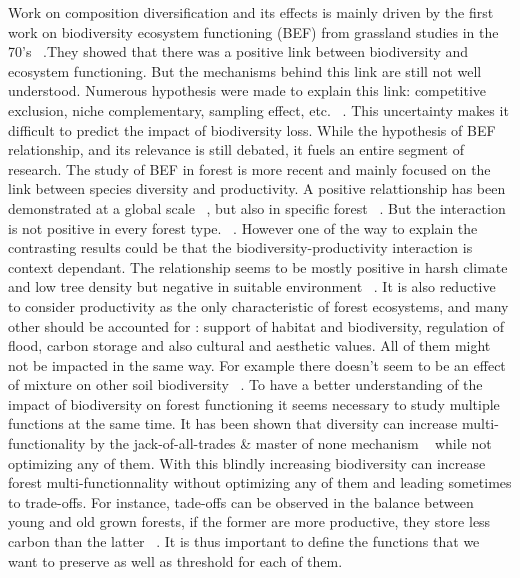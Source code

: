 \documentclass{article}
\begin{document}
Work on composition diversification and its effects is mainly driven by the first work on biodiversity ecosystem functioning (BEF) from grassland studies in the 70's ~\autocite{tilmanBiodiversityPopulationEcosystem1996}.They showed that there was a positive link between biodiversity and ecosystem functioning. But the mechanisms behind this link are still not well understood. Numerous hypothesis were made to explain this link: competitive exclusion, niche complementary, sampling effect, etc. ~\autocite{aliBiodiversityEcosystemFunctioning2023}. This uncertainty makes it difficult to predict the impact of biodiversity loss.
While the hypothesis of BEF relationship, and its relevance is still debated, it fuels an entire segment of research.
The study of BEF in forest is more recent and mainly focused on the link between species diversity and productivity. A positive relattionship has been demonstrated at a global scale ~\autocite{liangPositiveBiodiversityproductivityRelationship2016}, but also in specific forest ~\autocite{morinTreeSpeciesRichness2011,paquetteEffectBiodiversityTree2011,jourdanManagingMixedStands2021}. But the interaction is not positive in every forest type. ~\autocite{forresterReviewProcessesDiversity2016}.
However one of the way to explain the contrasting results could be that the biodiversity-productivity interaction is context dependant. The relationship seems to be mostly positive in harsh climate and low tree density but negative in suitable environment ~\autocite{juckerClimateModulatesEffects2016}.
It is also reductive to consider productivity as the only characteristic of forest ecosystems, and many other should be accounted for : support of habitat and biodiversity, regulation of flood, carbon storage and also cultural and aesthetic values.
All of them might not be impacted in the same way. For example there doesn't seem to be an effect of mixture on other soil biodiversity ~\autocite{korboulewskyHowTreeDiversity2016}.
To have a better understanding of the impact of biodiversity on forest functioning it seems necessary to study multiple functions at the same time. It has been shown that diversity can increase multi-functionality by the jack-of-all-trades \& master of none mechanism ~\autocite{vanderplasJackofalltradesEffectsDrive2016} while not optimizing any of them. With this blindly increasing biodiversity can increase forest multi-functionnality without optimizing any of them and leading sometimes to trade-offs. For instance, tade-offs can be observed in the balance between young and old grown forests, if the former are more productive, they store less carbon than the latter ~\autocite{caspersenSuccessionalDiversityForest2001}. It is thus important to define the functions that we want to preserve as well as threshold for each of them.
\end{document}

